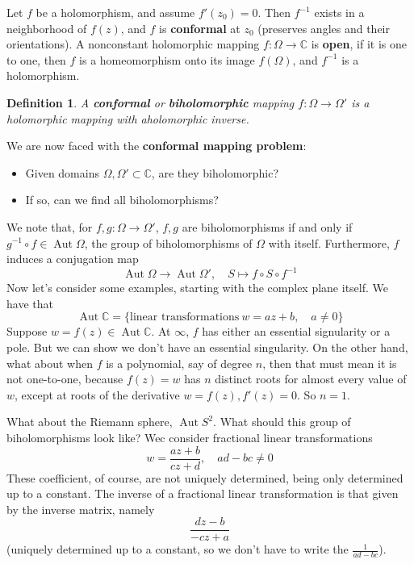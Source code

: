 \documentclass{article}
\newcommand{\mbb}[1]{\mathbb{#1}}
\newtheorem{definition}{Definition}
\DeclareMathOperator{\Aut}{Aut}
\begin{document}
Let \(f\) be a holomorphism, and assume \(f'(z_0) = 0\). Then \(f^{-1}\) exists in a neighborhood of \(f(z)\), and \(f\) is \textbf{conformal} at \(z_0\) (preserves angles and their orientations). A nonconstant holomorphic mapping \(f: \Omega \to \mbb{C}\) is \textbf{open}, if it is one to one, then \(f\) is a homeomorphism onto its image \(f(\Omega)\), and \(f^{-1}\) is a holomorphism.
\begin{definition}
A \textbf{conformal} or \textbf{biholomorphic} mapping \(f: \Omega \to \Omega'\) is a holomorphic mapping with aholomorphic inverse.
\end{definition}
We are now faced with the \textbf{conformal mapping problem}:
\begin{itemize}

  \item Given domains \(\Omega, \Omega' \subset \mbb{C}\), are they biholomorphic?

  \item If so, can we find all biholomorphisms?

\end{itemize}
We note that, for \(f, g: \Omega \to \Omega'\), \(f, g\) are biholomorphisms if and only if \(g^{-1} \circ f \in \Aut\Omega\), the group of biholomorphisms of \(\Omega\) with itself. Furthermore, \(f\) induces a conjugation map
\begin{equation}\Aut\Omega \to \Aut\Omega', \quad S \mapsto f \circ S \circ f^{-1}\end{equation}
Now let's consider some examples, starting with the complex plane itself. We have that
\begin{equation}\Aut\mbb{C} = \{\text{linear transformations} \ w = az + b, \quad a \neq 0\}\end{equation}
Suppose \(w = f(z) \in \Aut\mbb{C}\). At \(\infty\), \(f\) has either an essential signularity or a pole. But we can show we don't have an essential singularity. On the other hand, what about when \(f\) is a polynomial, say of degree \(n\), then that must mean it is not one-to-one, because
\(f(z) = w\) has \(n\) distinct roots for almost every value of \(w\), except at roots of the derivative \(w = f(z), f'(z) = 0\). So \(n = 1\).

What about the Riemann sphere, \(\Aut S^2\). What should this group of biholomorphisms look like? Wec consider fractional linear transformations
\begin{equation}w = \frac{az + b}{cz + d}, \quad ad - bc \neq 0\end{equation}
These coefficient, of course, are not uniquely determined, being only determined up to a constant. The inverse of a fractional linear transformation is that given by the inverse matrix, namely
\begin{equation}\frac{dz - b}{-cz + a}\end{equation}
(uniquely determined up to a constant, so we don't have to write the \(\frac{1}{ad - bc}\)).
\end{document}

